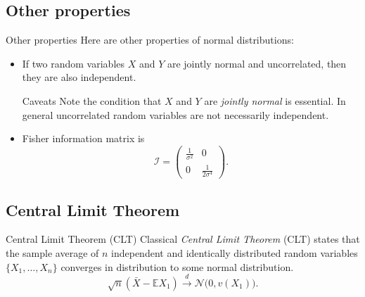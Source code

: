\documentclass{beamer}
\begin{document}
\subsection{Other properties}

\begin{frame}{Other properties}
  Here are other properties of normal distributions:
  \begin{itemize}
  \item<1-> If two random variables \(X\) and \(Y\) are jointly normal and
    uncorrelated, then they are also independent.
    \begin{alertblock}{Caveats}
      Note the condition that \(X\) and \(Y\) are \emph{jointly normal} is
      essential. In general uncorrelated random variables are not necessarily
      independent.
    \end{alertblock}
  \item<2-> Fisher information matrix is
    \begin{equation}
      \mathcal{I} =
      \begin{pmatrix}
        \frac{1}{\sigma^{2}} & 0 \\
        0 & \frac{1}{2\sigma^{4}}
      \end{pmatrix}.
    \end{equation}
  \end{itemize}
\end{frame}

\subsection{Central Limit Theorem}

\begin{frame}{Central Limit Theorem (CLT)}
  Classical \emph{Central Limit Theorem} (CLT) states that the sample average of
  \(n\) independent and identically distributed random variables
  \(\{X_{1}, \ldots, X_{n}\}\) converges in distribution to some normal
  distribution.
  \begin{equation}
    \sqrt{n}\left( \bar{X} - \mathbb{E}X_{1} \right) \xrightarrow{d}
    \mathcal{N}\bigl(0, v(X_{1})\bigr).
  \end{equation}

\end{frame}
\end{document}
